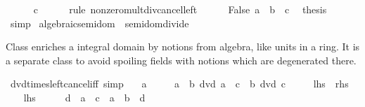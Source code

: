 \begin{isabellebody}
\ \isamarkupfalse%
\ {\isachardoublequoteopen}{\isasymdots}\ {\isacharequal}{\kern0pt}\ {\isacharminus}{\kern0pt}\ c{\isachardoublequoteclose}\isanewline
\ \ \ \ \isamarkupfalse%
\ {\isacharparenleft}{\kern0pt}rule\ nonzero{\isacharunderscore}{\kern0pt}mult{\isacharunderscore}{\kern0pt}div{\isacharunderscore}{\kern0pt}cancel{\isacharunderscore}{\kern0pt}left{\isacharparenright}{\kern0pt}\ \ \isanewline
\ \ \isamarkupfalse%
\ False\ {\isacartoucheopen}a\ {\isacharequal}{\kern0pt}\ b\ {\isacharasterisk}{\kern0pt}\ c{\isacartoucheclose}\ \isamarkupfalse%
\ {\isacharquery}{\kern0pt}thesis\isanewline
\ \ \ \ \isamarkupfalse%
\ simp\isanewline
{}\isamarkupfalse%
%
\endisatagproof
{\isafoldproof}%
%
\isadelimproof
\isanewline
%
\endisadelimproof
\isanewline
{}\isamarkupfalse%
\isanewline
\isanewline
{}\isamarkupfalse%
\ algebraic{\isacharunderscore}{\kern0pt}semidom\ {\isacharequal}{\kern0pt}\ semidom{\isacharunderscore}{\kern0pt}divide\isanewline
{}%
\begin{isamarkuptext}%
Class  enriches a integral domain
  by notions from algebra, like units in a ring.
  It is a separate class to avoid spoiling fields with notions
  which are degenerated there.%
\end{isamarkuptext}\isamarkuptrue%
\isamarkupfalse%
\ dvd{\isacharunderscore}{\kern0pt}times{\isacharunderscore}{\kern0pt}left{\isacharunderscore}{\kern0pt}cancel{\isacharunderscore}{\kern0pt}iff\ {\isacharbrackleft}{\kern0pt}simp{\isacharbrackright}{\kern0pt}{\isacharcolon}{\kern0pt}\isanewline
\ \ \ {\isachardoublequoteopen}a\ {\isasymnoteq}\ {}{\isachardoublequoteclose}\isanewline
\ \ \ {\isachardoublequoteopen}a\ {\isacharasterisk}{\kern0pt}\ b\ dvd\ a\ {\isacharasterisk}{\kern0pt}\ c\ {\isasymlongleftrightarrow}\ b\ dvd\ c{\isachardoublequoteclose}\isanewline
\ \ \ \ {\isacharparenleft}{\kern0pt}\ {\isachardoublequoteopen}{\isacharquery}{\kern0pt}lhs\ {\isasymlongleftrightarrow}\ {\isacharquery}{\kern0pt}rhs{\isachardoublequoteclose}{\isacharparenright}{\kern0pt}\isanewline
%
\isadelimproof
%
\endisadelimproof
%
\isatagproof
{}\isamarkupfalse%
\isanewline
\ \ \isamarkupfalse%
\ {\isacharquery}{\kern0pt}lhs\isanewline
\ \ \isamarkupfalse%
\ \isamarkupfalse%
\ d\ \ {\isachardoublequoteopen}a\ {\isacharasterisk}{\kern0pt}\ c\ {\isacharequal}{\kern0pt}\ a\ {\isacharasterisk}{\kern0pt}\ b\ {\isacharasterisk}{\kern0pt}\ d{\isachardoublequoteclose}\ \isacommand{{\isachardot}{\kern0pt}{\isachardot}{\kern0pt}}\isamarkupfalse%

\end{isabellebody}
